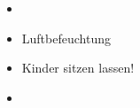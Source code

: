 \label{m:epiglottitis}
\begin{itemize}
    \item \TxMassVitMK
    \item Luftbefeuchtung
    \item Kinder sitzen lassen!
    \item {}
\end{itemize}